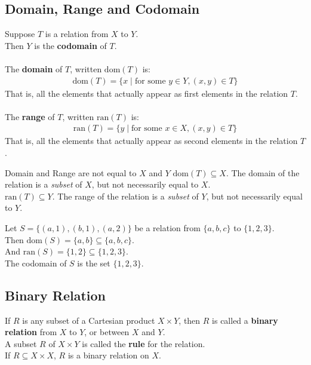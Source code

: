\documentclass[../notes.tex]{subfiles}
\begin{document}
			\subsection{Domain, Range and Codomain}
				Suppose $T$ is a relation from $X$ to $Y$.\\
				Then $Y$ is the \textbf{codomain} of $T$.\\
				\vspace{2mm}\\
				The \textbf{domain} of $T$, written $\mathrm{dom}(T)$ is:
					\begin{align*}
						\mathrm{dom}(T) = \{x \mid \text{for some } y \in Y, (x, y) \in T\}
					\end{align*}
				That is, all the elements that actually appear as first elements in the relation $T$.\\
				\vspace{2mm}\\
				The \textbf{range} of $T$, written $\mathrm{ran}(T)$ is:
				\begin{align*}
					\mathrm{ran}(T) = \{y \mid \text{for some } x \in X, (x, y) \in T\}
				\end{align*}
			That is, all the elements that actually appear as second elements in the relation $T$.
			\begin{sidenote}{Domain and Range are not equal to $X$ and $Y$}
				$\mathrm{dom}(T) \subseteq X$. The domain of the relation is a \textit{subset} of $X$, but not necessarily equal to $X$.\\
				$\mathrm{ran}(T) \subseteq Y$. The range of the relation is a \textit{subset} of $Y$, but not necessarily equal to $Y$.
			\end{sidenote}
			\begin{example}
				Let $S = \bigl\{(a, 1), (b, 1), (a, 2)\bigr\}$ be a relation from $\{a, b, c\}$ to $\{1, 2, 3\}$.\\
				Then $\mathrm{dom}(S) = \{a, b\} \subseteq \{a, b, c\}$.\\
				And $\mathrm{ran}(S) = \{1, 2\} \subseteq \{1, 2, 3\}$.\\
				The codomain of $S$ is the set $\{1, 2, 3\}$. 
			\end{example}
			\subsection{Binary Relation}
				If $R$ is any subset of a Cartesian product $X \times Y$, then $R$ is called a \textbf{binary relation} from $X$ to $Y$, or between $X$ and $Y$.\\
				A subset $R$ of $X \times Y$ is called the \textbf{rule} for the relation.\\
				If $R \subseteq X \times X$, $R$ is a binary relation on $X$.
			\pagebreak
\end{document}
